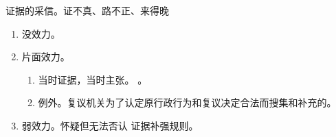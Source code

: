 \begin{enumerate}
\begin{enumerate}
        \end{enumerate}
        \begin{kk}{证据的采信。证不真、路不正、来得晚}
          \begin{enumerate}
            \item 没效力。
            \item 片面效力。
                  \begin{enumerate}
                    \item 当时证据，当时主张。
                          。
                    \item 例外。复议机关为了认定原行政行为和复议决定合法而搜集和补充的。
                  \end{enumerate}
            \item 弱效力。怀疑但无法否认 \yjt 证据补强规则。
          \end{enumerate}
        \end{kk}
\end{enumerate}
